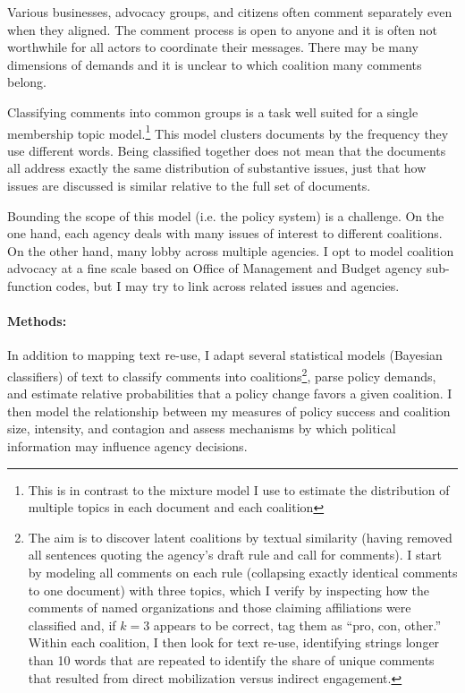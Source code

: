 Various businesses, advocacy groups, and citizens often comment separately even when they aligned. The comment process is open to anyone and it is often not worthwhile for all actors to coordinate their messages. There may be many dimensions of demands and it is unclear to which coalition many comments belong.

Classifying comments into common groups is a task well suited for a single membership topic model.\footnote{This is in contrast to the mixture model I use to estimate the distribution of multiple topics in each document and each coalition} This model clusters documents by the frequency they use different words. Being classified together does not mean that the documents all address exactly the same distribution of substantive issues, just that how issues are discussed is similar relative to the full set of documents.


Bounding the scope of this model (i.e. the policy system) is a challenge. On the one hand, each agency deals with many issues of interest to different coalitions. On the other hand, many lobby across multiple agencies. I opt to model coalition advocacy at a fine scale based on Office of Management and Budget agency sub-function codes, but I may try to link across related issues and agencies. 

\paragraph{Methods:} In addition to mapping text re-use, I adapt several statistical models (Bayesian classifiers) of text to classify comments into coalitions\footnote{
The aim is to discover latent coalitions by textual similarity (having removed all sentences quoting the agency's draft rule and call for comments). I start by modeling all comments on each rule (collapsing exactly identical comments to one document) with three topics, which I verify by inspecting how the comments of named organizations and those claiming affiliations were classified and, if $k=3$ appears to be correct, tag them as ``pro, con, other.'' Within each coalition, I then look for text re-use, identifying strings longer than 10 words that are repeated to identify the share of unique comments that resulted from direct mobilization versus indirect engagement.
}, parse policy demands, and estimate relative probabilities that a policy change favors a given coalition. I then model the relationship between my measures of policy success and coalition size, intensity, and contagion and assess mechanisms
by which political information may influence agency decisions.
